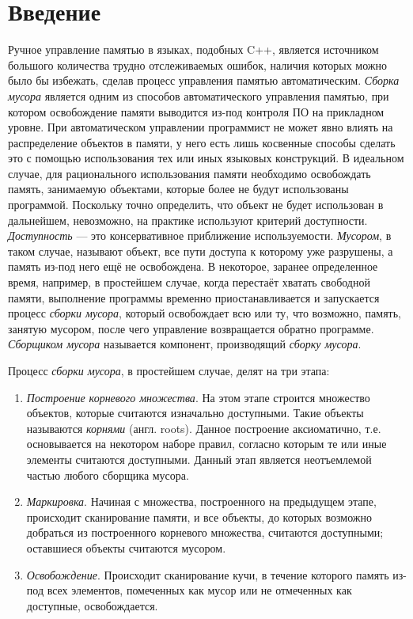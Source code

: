 \section*{Введение}

Ручное управление памятью в языках, подобных C++, является источником большого количества трудно отслеживаемых ошибок, наличия которых можно было бы
избежать, сделав процесс управления памятью автоматическим. \textit{Сборка мусора} является одним из способов автоматического управления памятью, при
котором освобождение памяти выводится из-под контроля ПО на прикладном уровне. При автоматическом управлении программист не может явно влиять на распределение
объектов в памяти, у него есть лишь
косвенные способы сделать это с помощью использования тех или иных языковых конструкций. В идеальном случае, для рационального использования
памяти необходимо освобождать память, занимаемую объектами, которые более не будут использованы программой. Поскольку точно определить, что
объект не будет использован в дальнейшем, невозможно, на практике используют критерий доступности. \textit{Доступность} --- это консервативное
приближение используемости. \textit{Мусором}, в таком случае, называют объект, все пути доступа к которому уже разрушены, а память из-под него
ещё не освобождена. В некоторое, заранее определенное время, например, в простейшем случае, когда перестаёт хватать свободной памяти, выполнение
программы временно приостанавливается и запускается процесс \textit{сборки мусора}, который освобождает всю или ту, что возможно, память,
занятую мусором, после чего управление возвращается обратно программе. \textit{Сборщиком мусора} называется компонент, производящий \textit{сборку мусора}.

Процесс \textit{сборки мусора}, в простейшем случае, делят на три этапа:
\begin{enumerate}
\item \textit{Построение корневого множества}. На этом этапе строится множество объектов, которые считаются изначально доступными.
Такие объекты называются \textit{корнями} (англ. roots). Данное построение
аксиоматично, т.е. основывается на некотором наборе правил, согласно которым те или иные элементы считаются доступными. Данный этап является неотъемлемой
частью любого сборщика мусора.
\item \textit{Маркировка}. Начиная с множества, построенного на предыдущем этапе, происходит сканирование памяти, и все объекты, до которых возможно
добраться из построенного корневого множества, считаются доступными; оставшиеся объекты считаются мусором.
\item \textit{Освобождение}. Происходит сканирование кучи, в течение которого память из-под всех элементов, помеченных как мусор или не отмеченных как
доступные, освобождается.
\end{enumerate}

